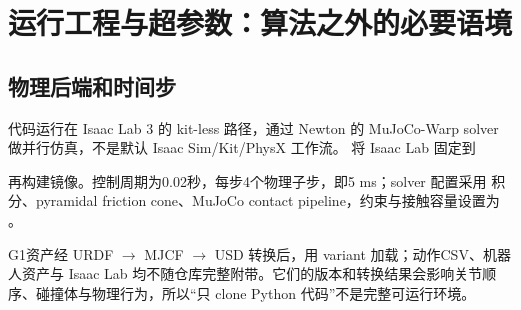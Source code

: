 \section{运行工程与超参数：算法之外的必要语境}
\subsection{物理后端和时间步}
代码运行在 Isaac Lab 3 的 kit-less 路径，通过 Newton 的 MuJoCo-Warp solver 做并行仿真，不是默认 Isaac Sim/Kit/PhysX 工作流。 将 Isaac Lab 固定到
\begin{center}\small{}\end{center}
再构建镜像。控制周期为0.02秒，每步4个物理子步，即5 ms；solver 配置采用  积分、pyramidal friction cone、MuJoCo contact pipeline，约束与接触容量设置为 。

G1资产经 URDF $\to$ MJCF $\to$ USD 转换后，用  variant 加载；动作CSV、机器人资产与 Isaac Lab 均不随仓库完整附带。它们的版本和转换结果会影响关节顺序、碰撞体与物理行为，所以“只 clone Python 代码”不是完整可运行环境。

